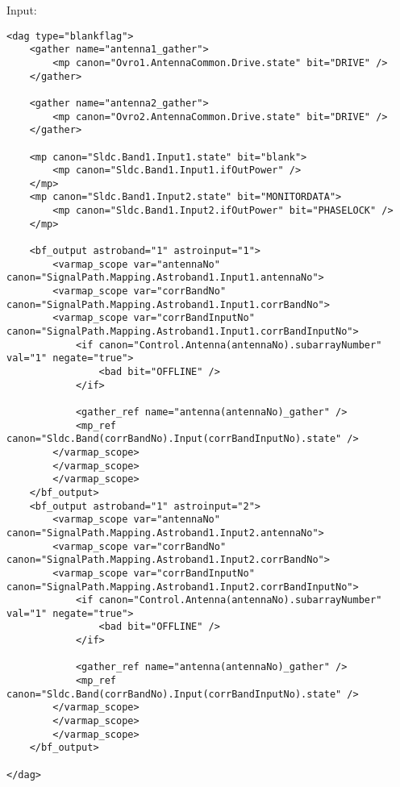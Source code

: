 \documentclass[letterpaper,12pt,oneside,pdftex]{article}
\begin{document}
\begin{minipage}{\textwidth}
Input: \\
\begin{scriptsize}
\begin{verbatim}
<dag type="blankflag">
    <gather name="antenna1_gather">
        <mp canon="Ovro1.AntennaCommon.Drive.state" bit="DRIVE" />
    </gather>

    <gather name="antenna2_gather">
        <mp canon="Ovro2.AntennaCommon.Drive.state" bit="DRIVE" />
    </gather>

    <mp canon="Sldc.Band1.Input1.state" bit="blank">
        <mp canon="Sldc.Band1.Input1.ifOutPower" />
    </mp>
    <mp canon="Sldc.Band1.Input2.state" bit="MONITORDATA">
        <mp canon="Sldc.Band1.Input2.ifOutPower" bit="PHASELOCK" />
    </mp>

    <bf_output astroband="1" astroinput="1">
        <varmap_scope var="antennaNo" canon="SignalPath.Mapping.Astroband1.Input1.antennaNo">
        <varmap_scope var="corrBandNo" canon="SignalPath.Mapping.Astroband1.Input1.corrBandNo">
        <varmap_scope var="corrBandInputNo" canon="SignalPath.Mapping.Astroband1.Input1.corrBandInputNo">
            <if canon="Control.Antenna(antennaNo).subarrayNumber" val="1" negate="true">
                <bad bit="OFFLINE" />
            </if>

            <gather_ref name="antenna(antennaNo)_gather" />
            <mp_ref canon="Sldc.Band(corrBandNo).Input(corrBandInputNo).state" />
        </varmap_scope>
        </varmap_scope>
        </varmap_scope>
    </bf_output>
    <bf_output astroband="1" astroinput="2">
        <varmap_scope var="antennaNo" canon="SignalPath.Mapping.Astroband1.Input2.antennaNo">
        <varmap_scope var="corrBandNo" canon="SignalPath.Mapping.Astroband1.Input2.corrBandNo">
        <varmap_scope var="corrBandInputNo" canon="SignalPath.Mapping.Astroband1.Input2.corrBandInputNo">
            <if canon="Control.Antenna(antennaNo).subarrayNumber" val="1" negate="true">
                <bad bit="OFFLINE" />
            </if>

            <gather_ref name="antenna(antennaNo)_gather" />
            <mp_ref canon="Sldc.Band(corrBandNo).Input(corrBandInputNo).state" />
        </varmap_scope>
        </varmap_scope>
        </varmap_scope>
    </bf_output>

</dag>
\end{verbatim}
\end{scriptsize}
\end{minipage}
\end{document}
